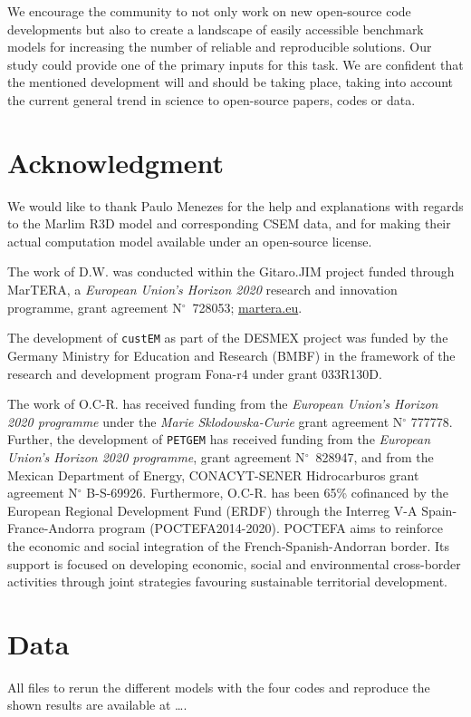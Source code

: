 \documentclass[
    paper,
  ]{geophysics}
\newcommand{\custem}{\texttt{custEM}\xspace}
\newcommand{\petgem}{\texttt{PETGEM}\xspace}
\newcommand{\itodo}[1]{\todo[inline]{\sffamily #1}}
\begin{document}
We encourage the community to not only work on new open-source code developments but also to create a landscape of easily accessible benchmark models for increasing the number of reliable and reproducible solutions. Our study could provide one of the primary inputs for this task. We are confident that the mentioned development will and should be taking place, taking into account the current general trend in science to open-source papers, codes or data.




\section{Acknowledgment}


We would like to thank Paulo Menezes for the help and explanations with regards to the Marlim R3D model and corresponding CSEM data, and for making their actual computation model available under an open-source license.

The work of D.W. was conducted within the Gitaro.JIM project funded through MarTERA, a \emph{European Union's Horizon 2020} research and innovation programme, grant agreement N$^\circ$~728053; \href{https://www.martera.eu}{martera.eu}.

The development of \custem as part of the DESMEX project was funded by the Germany Ministry for Education and Research (BMBF) in the framework of the research and development program Fona-r4 under grant 033R130D.

The work of O.C-R. has received funding from the \emph{European Union's Horizon 2020 programme} under the \emph{Marie Sklodowska-Curie} grant agreement N$^\circ$ 777778. Further, the development of \petgem has received funding from the \emph{European Union's Horizon 2020 programme}, grant agreement N$^\circ$~828947, and from the Mexican Department of Energy, CONACYT-SENER Hidrocarburos grant agreement N$^\circ$ B-S-69926. Furthermore, O.C-R. has been 65\% cofinanced by the European Regional Development Fund (ERDF) through the Interreg V-A Spain-France-Andorra program (POCTEFA2014-2020). POCTEFA aims to reinforce the economic and social integration of the French-Spanish-Andorran border. Its support is focused on developing economic, social and environmental cross-border activities through joint strategies favouring sustainable territorial development.


\section{Data}

All files to rerun the different models with the four codes and reproduce the shown results are available at \dots.
\itodo{Put up on Zenodo, link here.}



\end{document}
